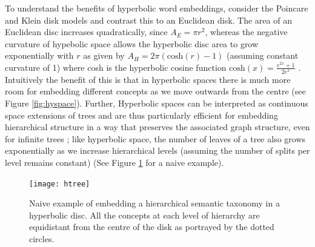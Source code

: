 \documentclass[12pt]{report}
\begin{document}
To understand the benefits of hyperbolic word embeddings, consider the Poincare and Klein disk models and contrast this to an Euclidean disk. The area of an Euclidean disc increases quadratically, since $A_E=\pi r^2$, whereas the negative curvature of hypebolic space allows the hyperbolic disc area to grow exponentially with $r$ as given by $A_H=2 \pi \left(\text{cosh}(r) - 1 \right)$ (assuming constant curvature of 1) where cosh is the hyperbolic cosine function $\text{cosh}(x)=\frac{e^{2x} + 1}{2e^x}$ \cite{Greenberg1994}. Intuitively the benefit of this is that in hyperbolic spaces there is much more room for embedding different concepts as we move outwards from the centre (see Figure \ref{fig:hyspace}). Further, Hyperbolic spaces can be interpreted as continuous space extensions of trees and are thus particularly efficient for embedding hierarchical structure in a way that preserves the associated graph structure, even for infinite trees \cite{Chamberlain2017}; like hyperbolic space, the number of leaves of a tree also grows exponentially as we increase hierarchical levels (assuming the number of splits per level remains constant) \cite{Nickel2017} (See Figure \ref{fig:htree} for a naive example). 

\begin{figure}
  \centering
  \texttt{[image: htree]}
	\caption{Naive example of embedding a hierarchical semantic taxonomy in a hyperbolic disc. All the concepts at each level of hierarchy are equidistant from the centre of the disk as portrayed by the dotted circles.}
  \label{fig:htree}
\end{figure}
\end{document}

